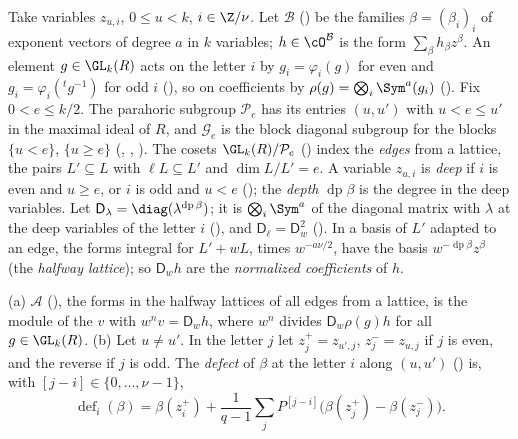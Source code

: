 Take variables $z_{u,i}$, $0\le u<k$, $i\in\Z/\nu$. Let $\mathcal B$ () be the
families $\beta=(\beta_i)_i$ of exponent vectors of degree $a$ in $k$ variables; $h\in\cO^{\mathcal B}$
is the form $\sum_\beta h_\beta z^\beta$. An element $g\in\GL_k(R)$ acts on the letter $i$ by
$g_i=\varphi_i(g)$ for even and $g_i=\varphi_i({}^tg^{-1})$ for odd $i$
(), so on coefficients by $\rho(g)=\bigotimes_i\Sym^a(g_i)$
(). Fix $0<e\le k/2$. The parahoric subgroup $\mathcal P_e$ has
its entries $(u,u')$ with $u<e\le u'$ in the maximal ideal of $R$, and $\mathcal G_e$ is the block
diagonal subgroup for the blocks $\{u<e\}$, $\{u\ge e\}$ (, ,
). The cosets $\GL_k(R)/\mathcal P_e$ () index the
\emph{edges} from a lattice, the pairs $L'\subseteq L$ with $\ell L\subseteq L'$ and $\dim L/L'=e$. A
variable $z_{u,i}$ is \emph{deep} if $i$ is even and $u\ge e$, or $i$ is odd and $u<e$
(); the \emph{depth} $\operatorname{dp}\beta$ is the degree in
the deep variables. Let $\mathsf D_\lambda=\diag(\lambda^{\operatorname{dp}\beta})$; it is $\bigotimes_i\Sym^a$
of the diagonal matrix with $\lambda$ at the deep variables of the letter $i$
(), and $\mathsf D_\ell=\mathsf D_w^2$
(). In a basis of $L'$ adapted to an edge, the forms integral for
$L'+wL$, times $w^{-a\nu/2}$, have the basis $w^{-\operatorname{dp}\beta}z^\beta$ (the \emph{halfway
lattice}); so $\mathsf D_wh$ are the \emph{normalized coefficients} of $h$.

\begin{definition}\label{ub-eldiv:def:defect}
(a) $\mathcal A$ (), the forms in the halfway lattices of all
edges from a lattice, is the module of the $v$ with $w^n v=\mathsf D_wh$, where $w^n$ divides
$\mathsf D_w\rho(g)h$ for all $g\in\GL_k(R)$.
(b) Let $u\ne u'$. In the letter $j$ let $z^+_j=z_{u',j}$, $z^-_j=z_{u,j}$ if $j$ is even, and the
reverse if $j$ is odd. The \emph{defect} of $\beta$ at the letter $i$ along $(u,u')$
() is, with $[j-i]\in\{0,\dots,\nu-1\}$,
\[
  \operatorname{def}_i(\beta)=\beta(z^+_i)+\frac1{q-1}\sum_{j}P^{[j-i]}\bigl(\beta(z^+_j)-\beta(z^-_j)\bigr).
\]
\end{definition}

